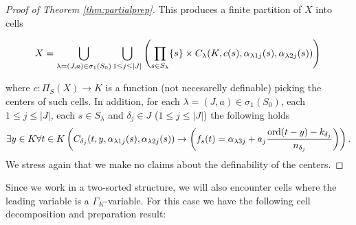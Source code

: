 \begin{proof}[Proof of Theorem \ref{thm:partialprep}]
This produces a finite partition of $X$ into cells

\[X = \bigcup_{\lambda=(J,a)\in \sigma_1(S_0)}\bigcup_{1\leq j\leq |J|}\left( \prod_{s\in S_\lambda} \{s\}\times C_{\lambda}(K,c(s),\alpha_{\lambda 1j}(s),\alpha_{\lambda 2j}(s))\right)\\
\]

where $c:\Pi_S(X)\to K$  is a function (not necesarelly definable) picking the centers of such cells. In addition, for each $\lambda=(J,a)\in \sigma_1(S_0)$, each $1\leq j\leq |J|$, each $s\in S_\lambda$ and $\delta_j\in J$ ($1\leq j\leq|J|$) the following holds \small
\[\exists y\in K\forall t\in K \left(C_{\delta_j}(t,y,\alpha_{\lambda 1j}(s),\alpha_{\lambda 2j}(s)) \rightarrow \left(f_s(t)=\alpha_{\lambda 3j}+a_j\frac{\operatorname{ord}(t-y)-k_{\delta_j}}{n_{\delta_j}}\right)\right).
\]
\normalsize
We stress again that we make no claims about the definability of the centers. 
\end{proof}

Since we work in a two-sorted structure, we will also encounter cells where the leading variable is a $\Gamma_K$-variable. For this case we have the following cell decomposition and preparation result:

